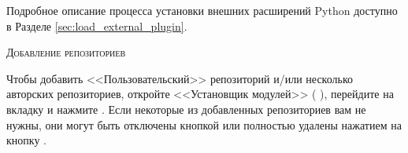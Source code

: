 Подробное описание процесса установки внешних расширений Python доступно в
Разделе \ref{sec:load_external_plugin}.

\begin{Tip} \caption{\textsc{Добавление репозиториев}}
Чтобы добавить <<Пользовательский>> репозиторий и/или несколько авторских
репозиториев, откройте <<Установщик модулей>> ( \arrow
{}), перейдите на
вкладку  и нажмите .
Если некоторые из добавленных репозиториев вам не нужны, они могут быть
отключены кнопкой  или полностью удалены нажатием
на кнопку .
\end{Tip}
\FloatBarrier
